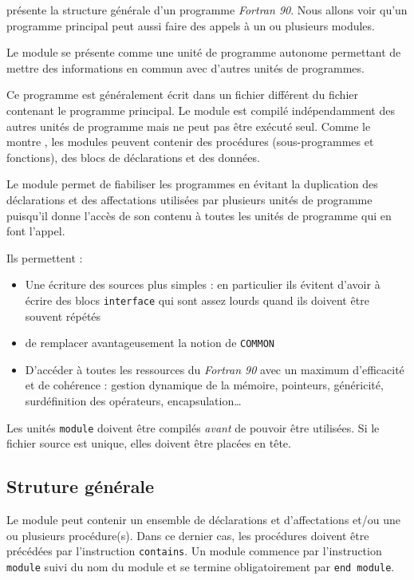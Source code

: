 \documentclass[a4paper,twoside]{article}
\begin{document}
 présente la structure générale d'un programme \emph{Fortran 90}. Nous allons voir qu'un programme principal peut aussi faire des appels à un ou plusieurs modules. 

\begin{definition}
Le module se présente comme une unité de programme autonome permettant de mettre des informations en commun avec d'autres unités de programmes. 
\end{definition}


Ce programme est généralement écrit dans un fichier différent du fichier contenant le programme principal. Le module est compilé indépendamment des autres unités de programme mais ne peut pas être exécuté seul. Comme le montre , les modules peuvent contenir des procédures (sous-programmes et fonctions), des blocs de déclarations et des données. 

Le module permet de fiabiliser les programmes en évitant la duplication des déclarations et des affectations utilisées par plusieurs unités de programme puisqu'il donne l'accès de son contenu à toutes les unités de programme qui en font l'appel.

Ils permettent : 
\begin{itemize}
\item Une écriture des sources plus simples : en particulier ils évitent d'avoir à écrire des blocs \texttt{interface} qui sont assez lourds quand ils doivent être souvent répétés
\item de remplacer avantageusement la notion de \texttt{COMMON}
\item D'accéder à toutes les ressources du \emph{Fortran 90} avec un maximum d'efficacité et de cohérence : gestion dynamique de la mémoire, pointeurs, généricité, surdéfinition des opérateurs, encapsulation\dots
\end{itemize}

\begin{attention}
Les unités \texttt{module} doivent être compilés \emph{avant} de pouvoir être utilisées. Si le fichier source est unique, elles doivent être placées en tête.
\end{attention}


\subsection{Struture générale}
Le module peut contenir un ensemble de déclarations et d'affectations et/ou une ou plusieurs procédure(s). Dans ce dernier cas, les procédures doivent être précédées par l'instruction \texttt{contains}. Un module commence par l'instruction \texttt{module} suivi du nom du module et se termine obligatoirement par \texttt{end module}.
\end{document}
